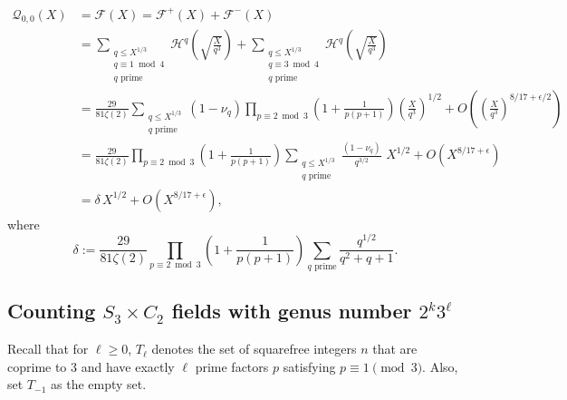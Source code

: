 \documentclass[11pt,reqno]{amsart}
\newcommand{\cF}{\mathcal{F}}
\newcommand{\cH}{\mathcal{H}}
\newcommand{\cQ}{\mathcal{Q}}
\theoremstyle{definition}
\theoremstyle{remark}
\begin{document}
\begin{align*}
	\cQ_{0,0}(X)&=\cF(X) 
	=\cF^+(X) + \cF^-(X)\\
    &=\sum_{\substack{q \leq X^{1/3} \\ q \equiv 1 \bmod{4}\\ q \text{ prime}}}  
	   \cH^q\!\left( \sqrt{ \frac{X}{q^3}} \right) + \sum_{\substack{q \leq X^{1/3} \\ q \equiv 3 \bmod{4}\\q \text{ prime}}} 
	   \cH^q\!\left( \sqrt{ \frac{X}{q^3}} \right) \\
	&= \frac{29}{81\zeta(2)} \sum_{\substack{q \leq X^{1/3} \\q \text{ prime}}} 
	    (1-\nu_q) 
	    \prod_{p \equiv 2 \bmod{3}} \!\left(1 + \frac{1}{p(p+1)}\right) 
	    \left(\frac{X}{q^3}\right)^{1/2} 
	    + O\!\left(\left(\frac{X}{q^3}\right)^{8/17 + \epsilon/2}\right) \\
	&= \frac{29}{81\zeta(2)} \prod_{p \equiv 2 \bmod{3}} \!\left(1 + \frac{1}{p(p+1)}\right) 
	    \sum_{\substack{q \leq X^{1/3} \\ q \text{ prime}}} 
	    \frac{(1-\nu_q)}{q^{3/2}}\,\, X^{1/2} 
	    + O\!\left(X^{8/17 + \epsilon}\right)\\
    &=\delta \, X^{1/2} +  O\!\left({X}^{8/17 + \epsilon}\right),
\end{align*}
where
$$
    \delta := \frac{29}{81\zeta(2)} \prod_{p \equiv 2 \bmod{3}} \!\left(1 + \frac{1}{p(p+1)}\right) 
	    \sum_{ q \text{ prime}} 
	    \frac{q^{1/2}}{q^2 + q + 1}.
$$

  \medskip

 \subsection{Counting $S_3\times C_2$ fields with genus number $2^{k}3^{\ell}$ }
Recall that for $\ell\geq 0$, $ T_{\ell} $ denotes the set of squarefree integers $ n $ that are coprime to 3 and have exactly $ \ell $ prime factors $ p$ satisfying $ p \equiv 1 \pmod{3} $. Also, set $T_{-1}$ as the empty set.
\end{document}
